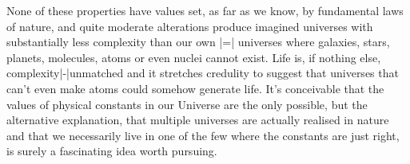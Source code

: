 None of these properties have values set, as far as we know, by fundamental laws
of nature, and quite moderate alterations produce imagined universes with
substantially less complexity than our own |=| universes where galaxies, stars,
planets, molecules, atoms or even nuclei cannot exist. Life is, if nothing else,
complexity|-|unmatched and it stretches credulity to suggest that universes that
can't even make atoms could somehow generate life. It's conceivable that the
values of physical constants in our Universe are the only possible, but the
alternative explanation, that multiple universes are actually realised in nature
and that we necessarily live in one of the few where the constants are \quote
{just right}, is surely a fascinating idea worth pursuing.
